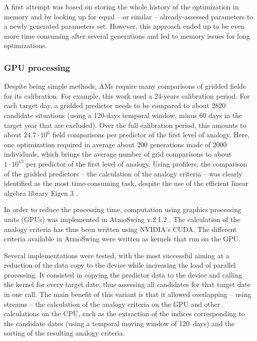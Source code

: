 \documentclass[draft]{agujournal2019}
\begin{document}
A first attempt was based on storing the whole history of the optimization in memory and by looking up for equal -- or similar -- already-assessed parameters to a newly generated parameters set. However, this approach ended up to be even more time consuming after several generations and led to memory issues for long optimizations.



\subsubsection{GPU processing}

Despite being simple methods, AMs require many comparisons of gridded fields for its calibration. For example, this work used a 24-years calibration period. For each target day, a gridded predictor needs to be compared to about 2820 candidate situations (using a 120-days temporal window, minus 60 days in the target year that are excluded). Over the full calibration period, this amounts to about $24.7\cdot10^6$ field comparisons per predictor of the first level of analogy. Here, one optimization required in average about 200 generations made of 2000 individuals, which brings the average number of grid comparisons to about $1\cdot10^{13}$ per predictor of the first level of analogy. Using profilers, the comparison of the gridded predictors -- the calculation of the analogy criteria -- was clearly identified as the most time-consuming task, despite the use of the efficient linear algebra library Eigen 3 \cite{Guennebaud2010}.

In order to reduce the processing time, computation using graphics processing units (GPUs) was implemented in AtmoSwing v.2.1.2 \cite{Horton2019b}. The calculation of the analogy criteria has thus been written using NVIDIA's CUDA. The different criteria available in AtmoSwing were written as kernels that run on the GPU.

Several implementations were tested, with the most successful aiming at a reduction of the data copy to the device while increasing the load of parallel processing. It consisted in copying the predictor data to the device and calling the kernel for every target date, thus assessing all candidates for that target date in one call. The main benefit of this variant is that it allowed overlapping -- using streams -- the calculation of the analogy criteria on the GPU and other calculations on the CPU, such as the extraction of the indices corresponding to the candidate dates (using a temporal moving window of 120~days) and the sorting of the resulting analogy criteria.
\end{document}
